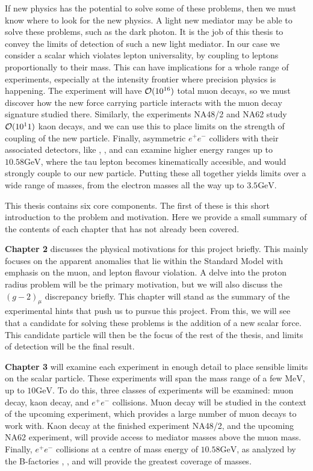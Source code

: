 If new physics has the potential to solve some of these problems, then we must know where to look for the new physics.
A light new mediator may be able to solve these problems, such as the dark photon.
It is the job of this thesis to convey the limits of detection of such a new light mediator.
In our case we consider a scalar which violates lepton universality, by coupling to leptons proportionally to their mass.
This can have implications for a whole range of experiments, especially at the intensity frontier where precision physics is happening.
The experiment \mueee will have $\operatorname{\mathcal{O}}(10^{16})$ total muon decays, so we must discover how the new force carrying particle interacts with the muon decay signature studied there.
Similarly, the experiments NA48/2 and NA62 study $\operatorname{\mathcal{O}}(10^11)$ kaon decays, and we can use this to place limits on the strength of coupling of the new particle.
Finally, asymmetric $e^+ e^-$ colliders with their associated detectors, like \babar, \belle, and \belletwo can examine higher energy ranges up to $10.58\textrm{GeV}$, where the tau lepton becomes kinematically accesible, and would strongly couple to our new particle.
Putting these all together yields limits over a wide range of masses, from the electron masses all the way up to $3.5\textrm{GeV}$.

This thesis contains six core components.
The first of these is this short introduction to the problem and motivation.
Here we provide a small summary of the contents of each chapter that has not already been covered.

\textbf{Chapter 2} discusses the physical motivations for this project briefly.
This mainly focuses on the apparent anomalies that lie within the Standard Model with emphasis on the muon, and lepton flavour violation.
A delve into the proton radius problem will be the primary motivation, but we will also discuss the $(g-2)_\mu$ discrepancy briefly.
This chapter will stand as the summary of the experimental hints that push us to pursue this project.
From this, we will see that a candidate for solving these problems is the addition of a new scalar force.
This candidate particle will then be the focus of the rest of the thesis, and limits of detection will be the final result.

\textbf{Chapter 3} will examine each experiment in enough detail to place sensible limits on the scalar particle.
These experiments will span the mass range of a few $\textrm{MeV}$, up to $10\textrm{GeV}$.
To do this, three classes of experiments will be examined: muon decay, kaon decay, and $e^+ e^-$ collisions.
Muon decay will be studied in the context of the upcoming \mueee experiment, which provides a large number of muon decays to work with.
Kaon decay at the finished experiment NA48/2, and the upcoming NA62 experiment, will provide access to mediator masses above the muon mass.
Finally, $e^+ e^-$ collisions at a centre of mass energy of $10.58\textrm{GeV}$, as analyzed by the B-factories \babar, \belle, and \belletwo will provide the greatest coverage of masses.

